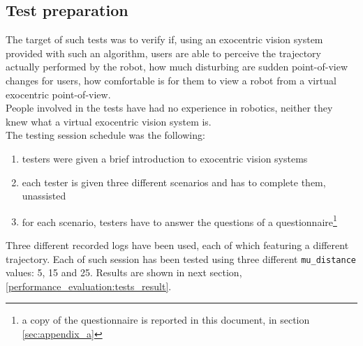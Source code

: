 \subsection{Test preparation}
\label{performance_evaluation:testpreparation}
%
The target of such tests was to verify  if, using 
an exocentric vision system provided with such an algorithm, 
users are able to perceive the trajectory actually 
performed by the robot,  how much disturbing are 
sudden point-of-view changes for users,  how 
comfortable is for them to view a robot from a 
virtual exocentric point-of-view.
\\
People involved in the tests have had no experience in 
robotics, neither they knew what a virtual exocentric 
vision system is.
\\
The testing session schedule was the following:
\begin{enumerate}
  \item testers were given a brief introduction to exocentric vision systems
  \item each tester is given three different scenarios and has to 
    complete them, unassisted
  \item for each scenario, testers have to answer the questions 
    of a questionnaire\footnote{a copy of the questionnaire is 
      reported in this document, in section \ref{sec:appendix_a}}
\end{enumerate}

Three different recorded logs have been used, each of which featuring 
a different trajectory. Each of such session has been tested
using three different \texttt{mu\_distance} values: 5, 15 and 25.
Results are shown in next section,
\ref{performance_evaluation:tests_result}.
